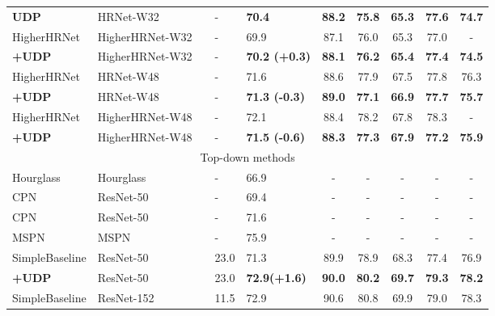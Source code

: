 \documentclass[10pt,journal,compsoc]{IEEEtran}
\begin{document}
\begin{table*}
\begin{center}
\begin{tabular}{l|l|c|l|lccccc}
\hline
\textbf{UDP}             & HRNet-W32      &   &-&\textbf{70.4}        & \textbf{88.2} & \textbf{75.8} & \textbf{65.3} &\textbf{77.6}  &\textbf{74.7} \\
HigherHRNet \cite{Higher}& HigherHRNet-W32&   &-&69.9                 & 87.1          & 76.0          & 65.3          &77.0           & -            \\
\textbf{+UDP}            & HigherHRNet-W32&   &-&\textbf{70.2 (+0.3)} & \textbf{88.1} & \textbf{76.2} & \textbf{65.4} &\textbf{77.4}  &\textbf{74.5} \\
HigherHRNet \cite{Higher}&HRNet-W48& &-&71.6                 & 88.6              & 77.9           & 67.5          &77.8           &76.3\\
\textbf{+UDP}            &HRNet-W48       &   &-&\textbf{71.3 (-0.3)}        & \textbf{89.0}     & \textbf{77.1}  & \textbf{66.9} &\textbf{77.7}  &\textbf{75.7}\\
HigherHRNet \cite{Higher}& HigherHRNet-W48&   &-&72.1                 & 88.4          & 78.2          & 67.8          &78.3           & -            \\
\textbf{+UDP}            & HigherHRNet-W48&   &-&\textbf{71.5 (-0.6)} & \textbf{88.3} & \textbf{77.3} & \textbf{67.9} &\textbf{77.2}  &\textbf{75.9} \\
\hline
\multicolumn{10}{c}{Top-down methods}\\
\hline
Hourglass\cite{Hourglass}  & Hourglass        &    &-&66.9  & -            & -                   & -                  &-                &-   \\
CPN\cite{CPN}              & ResNet-50        &    &-&69.4   & -            & -                   & -                  &-                &-   \\
CPN\cite{CPN}              & ResNet-50        &    &-&71.6   & -                & -                  & -                   &-           &-  \\
MSPN\cite{MSPN}            & MSPN             &    &-&75.9     & -            & -                   & -                  &-                &-   \\
\hline
SimpleBaseline\cite{SBNet} & ResNet-50        &    &23.0&71.3              & 89.9     & 78.9      & 68.3     &77.4      &76.9\\
\textbf{+UDP}              & ResNet-50        &    &23.0&\textbf{72.9(+1.6)}  &\textbf{90.0}    &\textbf{80.2}    &\textbf{69.7}    &\textbf{79.3}   &\textbf{78.2}\\
SimpleBaseline\cite{SBNet} & ResNet-152       &    &11.5&72.9             & 90.6      & 80.8     & 69.9     &79.0      &78.3\\

\end{tabular}
\end{center}
\end{table*}
\end{document}
